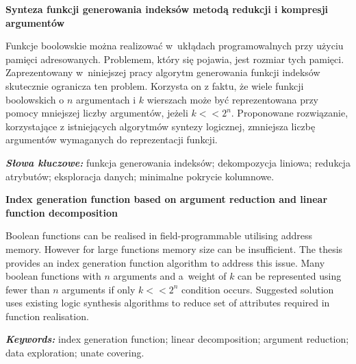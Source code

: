 \newpage
\vspace{10cm}

\newpage
\begin{center}
	\textbf{Synteza funkcji generowania indeksów metodą redukcji i kompresji argumentów}
\end{center}

Funkcje boolowskie można realizować w~ukłądach programowalnych przy użyciu pamięci adresowanych.
Problemem, który się pojawia, jest rozmiar tych pamięci.
Zaprezentowany w~niniejszej pracy algorytm generowania funkcji indeksów skutecznie ogranicza ten problem.
Korzysta on z faktu,
że wiele funkcji boolowskich o $n$ argumentach i $k$ wierszach może być reprezentowana przy pomocy mniejszej liczby argumentów,
jeżeli $k<<2^n$.
Proponowane rozwiązanie,
korzystające z istniejących algorytmów syntezy logicznej,
zmniejsza liczbę argumentów wymaganych do reprezentacji funkcji.

\textit{\textbf{Słowa kluczowe:}} funkcja generowania indeksów; dekompozycja liniowa; redukcja atrybutów; eksploracja danych; minimalne pokrycie kolumnowe.

	\vspace{1cm}

\begin{center}
    \textbf{Index generation function based on argument reduction and linear function decomposition}
\end{center}

Boolean functions can be realised in field-programmable utilising address memory.
However for large functions memory size can be insufficient.
The thesis provides an index generation function algorithm to address this issue.
Many boolean functions with $n$ arguments and a~weight of $k$ can be represented using fewer than $n$ arguments if only $k<<2^n$ condition occurs.
Suggested solution uses existing logic synthesis algorithms to reduce set of attributes required in function realisation.

\textit{\textbf{Keywords:}} index generation function; linear decomposition; argument reduction; data exploration; unate covering.


